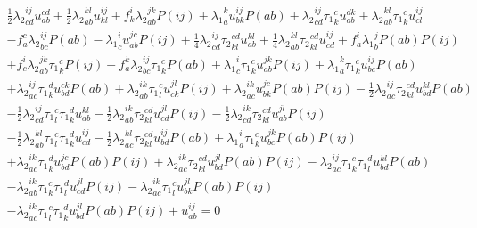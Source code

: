 \begin{gather*}
  \frac{1}{2}{\lambda_2}^{ij}_{cd} u^{cd}_{ab}
+ \frac{1}{2}{\lambda_2}^{kl}_{ab} u^{ij}_{kl}
+ f^{i}_{k} {\lambda_2}^{jk}_{ab} P(ij)
+ {\lambda_1}^{k}_{a} u^{ij}_{bk} P(ab)
+ {\lambda_2}^{ij}_{cd} {\tau_1}^{c}_{k} u^{dk}_{ab}
+ {\lambda_2}^{kl}_{ab} {\tau_1}^{c}_{k} u^{ij}_{cl} \\
- f^{c}_{a} {\lambda_2}^{ij}_{bc} P(ab)
- {\lambda_1}^{i}_{c} u^{jc}_{ab} P(ij)
+ \frac{1}{4}{\lambda_2}^{ij}_{cd} {\tau_2}^{cd}_{kl} u^{kl}_{ab}
+ \frac{1}{4}{\lambda_2}^{kl}_{ab} {\tau_2}^{cd}_{kl} u^{ij}_{cd}
+ f^{i}_{a} {\lambda_1}^{j}_{b} P(ab) P(ij) \\
+ f^{i}_{c} {\lambda_2}^{jk}_{ab} {\tau_1}^{c}_{k} P(ij)
+ f^{k}_{a} {\lambda_2}^{ij}_{bc} {\tau_1}^{c}_{k} P(ab)
+ {\lambda_1}^{i}_{c}   {\tau_1}^{c}_{k} u^{jk}_{ab} P(ij)
+ {\lambda_1}^{k}_{a}   {\tau_1}^{c}_{k} u^{ij}_{bc} P(ab) \\
+ {\lambda_2}^{ij}_{ac} {\tau_1}^{d}_{k} u^{ck}_{bd} P(ab)
+ {\lambda_2}^{ik}_{ab} {\tau_1}^{c}_{l} u^{jl}_{ck} P(ij)
+ {\lambda_2}^{ik}_{ac} u^{jc}_{bk} P(ab) P(ij)
- \frac{1}{2}{\lambda_2}^{ij}_{ac} {\tau_2}^{cd}_{kl} u^{kl}_{bd} P(ab) \\
- \frac{1}{2}{\lambda_2}^{ij}_{cd} {\tau_1}^{c}_{l} {\tau_1}^{d}_{k} u^{kl}_{ab}
- \frac{1}{2}{\lambda_2}^{ik}_{ab} {\tau_2}^{cd}_{kl} u^{jl}_{cd} P(ij)
- \frac{1}{2}{\lambda_2}^{ik}_{cd} {\tau_2}^{cd}_{kl} u^{jl}_{ab} P(ij) \\
- \frac{1}{2}{\lambda_2}^{kl}_{ab} {\tau_1}^{c}_{l} {\tau_1}^{d}_{k} u^{ij}_{cd}
- \frac{1}{2}{\lambda_2}^{kl}_{ac} {\tau_2}^{cd}_{kl} u^{ij}_{bd} P(ab)
+ {\lambda_1}^{i}_{a}   {\tau_1}^{c}_{k} u^{jk}_{bc} P(ab) P(ij) \\
+ {\lambda_2}^{ik}_{ac} {\tau_1}^{d}_{k} u^{jc}_{bd} P(ab) P(ij)
+ {\lambda_2}^{ik}_{ac} {\tau_2}^{cd}_{kl} u^{jl}_{bd} P(ab) P(ij)
- {\lambda_2}^{ij}_{ac} {\tau_1}^{c}_{k} {\tau_1}^{d}_{l} u^{kl}_{bd} P(ab) \\
- {\lambda_2}^{ik}_{ab} {\tau_1}^{c}_{k} {\tau_1}^{d}_{l} u^{jl}_{cd} P(ij)
- {\lambda_2}^{ik}_{ac} {\tau_1}^{c}_{l} u^{jl}_{bk} P(ab) P(ij) \\
- {\lambda_2}^{ik}_{ac} {\tau_1}^{c}_{l} {\tau_1}^{d}_{k} u^{jl}_{bd} P(ab) P(ij)
+ u^{ij}_{ab} = 0
\end{gather*}

